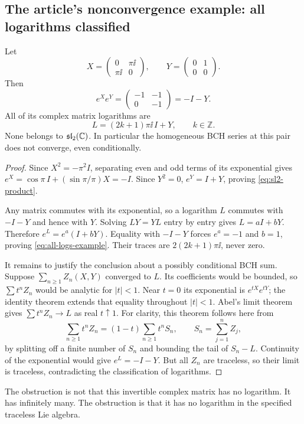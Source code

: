 \subsection{The article's nonconvergence example: all logarithms classified}
\begin{theorem}\label{thm:sl2-example}
Let
\begin{equation}\label{eq:sl2-example}
 X=\begin{pmatrix}0&\pi\ii\\\pi\ii&0\end{pmatrix},
 \qquad Y=\begin{pmatrix}0&1\\0&0\end{pmatrix}.
\end{equation}
Then
\begin{equation}\label{eq:sl2-product}
 e^Xe^Y=\begin{pmatrix}-1&-1\\0&-1\end{pmatrix}=-I-Y.
\end{equation}
All of its complex matrix logarithms are
\begin{equation}\label{eq:all-logs-example}
 L=(2k+1)\pi\ii\,I+Y,\qquad k\in\mathbb Z.
\end{equation}
None belongs to $\mathfrak{sl}_2(\mathbb C)$. In particular the homogeneous BCH series at this pair does not converge, even conditionally.
\end{theorem}
\begin{proof}
Since $X^2=-\pi^2I$, separating even and odd terms of its exponential gives
$e^X=\cos\pi\,I+(\sin\pi/\pi)X=-I$.
Since $Y^2=0$, $e^Y=I+Y$, proving \cref{eq:sl2-product}.

Any matrix commutes with its exponential, so a logarithm $L$ commutes with $-I-Y$ and hence with $Y$. Solving $LY=YL$ entry by entry gives $L=aI+bY$. Therefore
$e^L=e^a(I+bY)$.
Equality with $-I-Y$ forces $e^a=-1$ and $b=1$, proving \cref{eq:all-logs-example}. Their traces are $2(2k+1)\pi\ii$, never zero.

It remains to justify the conclusion about a possibly conditional BCH sum. Suppose $\sum_{n\geq1}Z_n(X,Y)$ converged to $L$. Its coefficients would be bounded, so $\sum t^nZ_n$ would be analytic for $|t|<1$. Near $t=0$ its exponential is $e^{tX}e^{tY}$; the identity theorem extends that equality throughout $|t|<1$. Abel's limit theorem gives $\sum t^nZ_n\to L$ as real $t\uparrow1$. For clarity, this theorem follows here from
\[
 \sum_{n\geq1}t^nZ_n=(1-t)\sum_{n\geq1}t^nS_n,
 \qquad S_n=\sum_{j=1}^nZ_j,
\]
by splitting off a finite number of $S_n$ and bounding the tail of $S_n-L$.
Continuity of the exponential would give $e^L=-I-Y$. But all $Z_n$ are traceless, so their limit is traceless, contradicting the classification of logarithms.
\end{proof}
The obstruction is not that this invertible complex matrix has no logarithm. It has infinitely many. The obstruction is that it has no logarithm in the specified traceless Lie algebra.

